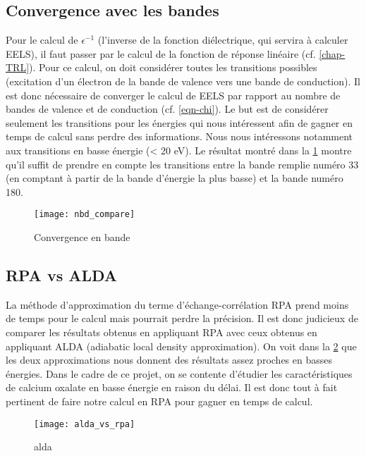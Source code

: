 \subsection{Convergence avec les bandes}
Pour le calcul de $\epsilon^{-1}$ (l'inverse de la fonction diélectrique, qui servira à calculer EELS),
il faut passer par le calcul de la fonction de réponse linéaire (cf. \cref{chap-TRL}).
Pour ce calcul, on doit considérer toutes les transitions possibles
(excitation d'un électron de la bande de valence vers une bande de conduction).
Il est donc nécessaire de converger le calcul de EELS par rapport au nombre de bandes de valence
et de conduction (cf. \cref{eqn-chi}).
Le but est de considérer seulement les transitions pour les énergies qui nous intéressent
afin de gagner en temps de calcul sans perdre des informations.
Nous nous intéressons notamment aux transitions en basse énergie (< 20 eV).
Le résultat montré dans la \cref{fig-cv_nbd} montre qu'il suffit de prendre en compte
les transitions entre la bande remplie numéro 33
(en comptant à partir de la bande d'énergie la plus basse) et la bande numéro 180.

\begin{figure}[!h]
    \centering
    \texttt{[image: nbd\_compare]}
    \caption{Convergence en bande}\label{fig-cv_nbd}
\end{figure}

\subsection{RPA vs ALDA}
La méthode d'approximation du terme d'échange-corrélation RPA prend moins de temps
pour le calcul mais pourrait perdre la précision.
Il est donc judicieux de comparer les résultats obtenus en appliquant RPA avec ceux obtenus
en appliquant ALDA (adiabatic local density approximation).
On voit dans la \cref{fig-alda_vs_rpa} que
les deux approximations nous donnent des résultats assez proches en basses énergies.
Dans le cadre de ce projet, on se contente d'étudier les caractéristiques
de calcium oxalate en basse énergie en raison du délai.
Il est donc tout à fait pertinent de faire notre calcul en RPA pour gagner en temps de calcul.
\begin{figure}[!h]
    \centering
    \texttt{[image: alda\_vs\_rpa]}
    \caption{alda}\label{fig-alda_vs_rpa}
\end{figure}
\clearpage

